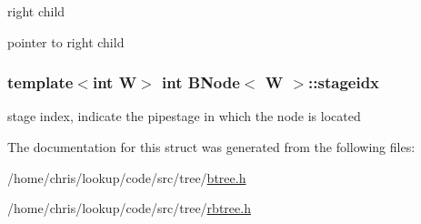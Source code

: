 right child 

pointer to right child \hypertarget{structBNode_adebd283b08369a1499a95d23f0268ecc}{
\subsubsection[{stageidx}]{\setlength{\rightskip}{0pt plus 5cm}template$<$int W$>$ int {\bf B\-Node}$<$ {\bf W} $>$\-::stageidx}}\label{structBNode_adebd283b08369a1499a95d23f0268ecc}


stage index, indicate the pipestage in which the node is located 



The documentation for this struct was generated from the following files\-:\begin{DoxyCompactItemize}
\item 
/home/chris/lookup/code/src/tree/\hyperlink{btree_8h}{btree.\-h}\item 
/home/chris/lookup/code/src/tree/\hyperlink{rbtree_8h}{rbtree.\-h}\end{DoxyCompactItemize}
